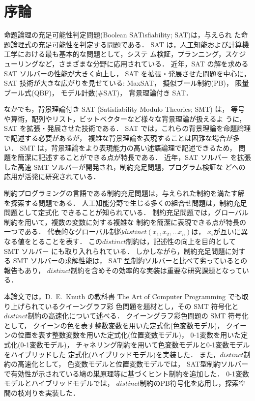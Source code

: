 \chapter{序論}
命題論理の充足可能性判定問題(Boolean SATisfiability; SAT)\cite{JSAI:InoueT10}は，与えられ
た命題論理式の充足可能性を判定する問題である．
SAT は，人工知能および計算機工学における最も基本的な問題として，システ
ム検証，プランニング，スケジューリングなど，さまざまな分野に応用されている．
近年，SAT の解を求める SAT ソルバーの性能が大きく向上し，
SAT を拡張・発展させた問題を中心に，SAT 技術が大きな広がりを見せている:
MaxSAT，
擬似ブール制約(PB)，
限量ブール式(QBF)，
モデル計数(\#SAT)，
背景理論付き SAT．

なかでも，背景理論付き SAT (Satisfiability Modulo Theories; SMT) \cite{JSAI:IwanumaN10, Umemura10:jssst, weko_169448_1}は，
等号や算術，配列やリスト，ビットベクターなど様々な背景理論が扱えるよ
うに，SAT を拡張・発展させた技術である．
SAT では，これらの背景理論を命題論理で記述する必要があるが，
複雑な背景理論を表現することは困難な場合が多い．
SMT は，背景理論をより表現能力の高い述語論理で記述できるため，
問題を簡潔に記述することができる点が特長である．
近年，SAT ソルバー
を拡張した高速 SMT ソルバーが開発され，制約充足問題，プログラム検証な
どへの応用が活発に研究されている．

制約プログラミングの言語である制約充足問題\cite{JSAI:TamuraTB10}は，与えられた制約を満たす解
を探索する問題である．
人工知能分野で生じる多くの組合せ問題は，制約充足問題として定式化
できることが知られている．
制約充足問題では，グローバル制約を用いて，複数の変数に対する複雑な
制約を簡潔に表現できる点が特長の一つである．
代表的なグローバル制約$distinct(x_{1},x_{2},\ldots x_{n})$は，
$x_{i}$が互いに異なる値をとることを表す．
この$distinct$制約は，記述性の向上を目的として SMT ソルバー
にも取り入れられている．
しかしながら，制約充足問題に対する SMT ソルバーの求解性能は，
SAT 型制約ソルバーと比べて劣っているとの報告もあり，
$distinct$制約を含めその効率的な実装は重要な研究課題となっている．

本論文では，D.~E.~Knuth の教科書
The Art of Computer Programming\cite{Knuth:TAOCP:SAT}
でも取り上げられているクイーングラフ彩
色問題を題材とし，その SMT 符号化と$distinct$制約の高速化について述べる．
クイーングラフ彩色問題の SMT 符号化として，
クイーンの色を表す整数変数を用いた定式化(色変数モデル)，
クイーンの位置を表す整数変数を用いた定式化(位置変数モデル)，
0-1変数を用いた定式化(0-1変数モデル)，
チャネリング制約を用いて色変数モデルと0-1変数モデルをハイブリッドした
定式化(ハイブリッドモデル)を実装した．
また，$distinct$制約の高速化として，
色変数モデルと位置変数モデルでは，
SAT型制約ソルバーで有効性が示されている鳩の巣原理等に基づくヒント制約を追加した．
0-1変数モデルとハイブリッドモデルでは，
$distinct$制約のPB符号化\cite{Ono19:ai}を応用し，探索空間の枝刈りを実装した．

